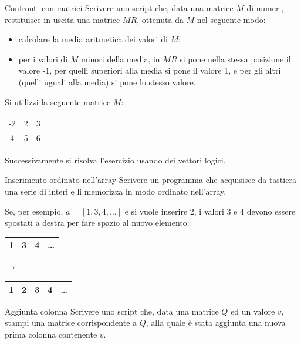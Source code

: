 \documentclass[aspectratio=169]{beamer}
\begin{document}
\begin{frame}{Confronti con matrici}
Scrivere uno script che, data una matrice $M$ di numeri, restituisce in uscita una matrice $MR$, ottenuta da $M$ nel seguente modo:
\begin{itemize}
	\item calcolare la media aritmetica dei valori di $M$;
	\item per i valori di $M$ minori della media, in $MR$ si
pone nella stessa posizione il valore -1, per quelli superiori alla media si pone il valore 1, e per gli altri (quelli uguali alla media) si pone lo stesso valore.
\end{itemize}

Si utilizzi la seguente matrice $M$:
\begin{tabular}{|ccc|}
	\hline
	-2&2&3\\
	4&5&6\\
	\hline
\end{tabular}

\pause
Successivamente si risolva l'esercizio usando dei vettori logici.
\end{frame}

\begin{frame}{Inserimento ordinato nell'array}
Scrivere un programma che acquisisce da tastiera una serie di interi e li memorizza in modo ordinato nell'array.

\pause
    Se, per esempio, $a = [1, 3, 4, \dots]$ e si vuole inserire 2, i valori 3 e 4 devono essere spostati a destra per fare spazio al nuovo elemento:

\centering
\begin{tabular}{|c|c|c|c|}
	\hline
	1&3&4& \dots \\
	\hline
\end{tabular}
$\rightarrow$
\begin{tabular}{|c|c|c|c|c|}
	\hline
	1& \alert{2} &3&4& \dots \\
	\hline
\end{tabular}
\end{frame}


\begin{frame}{Aggiunta colonna}
Scrivere uno script che, data una matrice $Q$ ed un valore $v$, stampi una
matrice corrispondente a $Q$, alla quale è stata aggiunta una nuova prima
colonna contenente $v$.
\end{frame}
\end{document}
